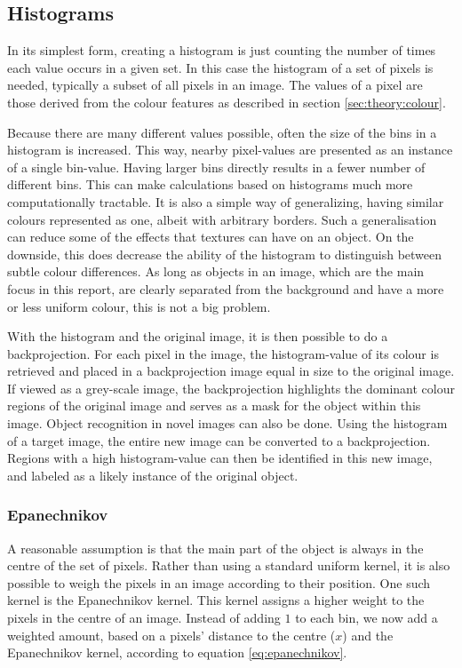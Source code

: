 \documentclass[a4paper,11pt]{article}
\begin{document}
\subsection{Histograms}
\label{sec:theory:histograms}
In its simplest form, creating a histogram is just counting the number of times each value occurs in a given set.
In this case the histogram of a set of pixels is needed, typically a subset of all pixels in an image.
The values of a pixel are those derived from the colour features as described in section \ref{sec:theory:colour}.

Because there are many different values possible, often the size of the bins in a histogram is increased.
This way, nearby pixel-values are presented as an instance of a single bin-value.
Having larger bins directly results in a fewer number of different bins.
This can make calculations based on histograms much more computationally tractable.
It is also a simple way of generalizing, having similar colours represented as one, albeit with arbitrary borders.
Such a generalisation can reduce some of the effects that textures can have on an object.
On the downside, this does decrease the ability of the histogram to distinguish between subtle colour differences.
As long as objects in an image, which are the main focus in this report, are clearly separated from the background and have a more or less uniform colour, this is not a big problem.

With the histogram and the original image, it is then possible to do a backprojection.
For each pixel in the image, the histogram-value of its colour is retrieved and placed in a backprojection image equal in size to the original image.
If viewed as a grey-scale image, the backprojection highlights the dominant colour regions of the original image and serves as a mask for the object within this image.
Object recognition in novel images can also be done.
Using the histogram of a target image, the entire new image can be converted to a backprojection.
Regions with a high histogram-value can then be identified in this new image, and labeled as a likely instance of the original object.

\subsubsection{Epanechnikov}
\label{sec:theory:epanechnikoc}
A reasonable assumption is that the main part of the object is always in the centre of the set of pixels.
Rather than using a standard uniform kernel, it is also possible to weigh the pixels in an image according to their position.
One such kernel is the Epanechnikov kernel.
This kernel assigns a higher weight to the pixels in the centre of an image.
Instead of adding $1$ to each bin, we now add a weighted amount, based on a pixels' distance to the centre ($x$) and the Epanechnikov kernel, according to equation \ref{eq:epanechnikov}.
\end{document}

